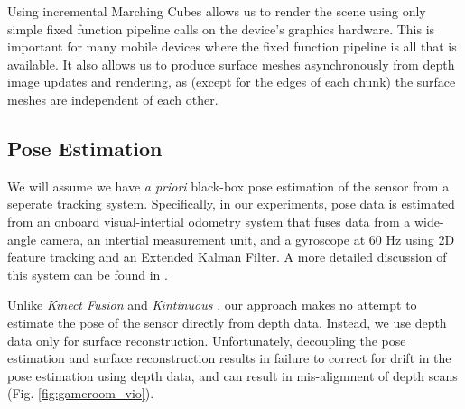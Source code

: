 \documentclass[10pt,twocolumn,letterpaper]{article}
\begin{document}
Using incremental Marching Cubes allows us to render the scene using only simple
fixed function pipeline calls on the device's graphics hardware. This is
important for many mobile devices where the fixed function pipeline is all that
is available. It also allows us to produce surface meshes asynchronously from
depth image updates and rendering, as (except for the edges of  each chunk) the
surface meshes are independent of each other.

\subsection{Pose Estimation}
We will assume we  have \textit{a priori} black-box pose estimation of
the sensor from a seperate tracking system. Specifically, in our experiments,
pose data is estimated from an onboard visual-intertial odometry system that
fuses data from a wide-angle camera, an intertial measurement unit, and a
gyroscope at 60 Hz using 2D feature tracking and an Extended Kalman Filter. A
more detailed discussion of this system can be found in \cite{VINS}. 

Unlike \textit{Kinect Fusion} \cite{Newcombe} and \textit{Kintinuous}
\cite{Whelan2013}, our approach makes no attempt to estimate the pose of the
sensor directly from depth data. Instead, we use depth data only for surface
reconstruction. Unfortunately, decoupling the pose estimation and surface
reconstruction results in failure to correct for drift in the pose estimation
using depth data, and can result in mis-alignment of depth scans (Fig.
\ref{fig:gameroom_vio}).
\end{document}
